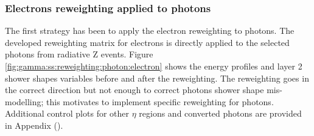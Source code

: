 \subsubsection{Electrons reweighting applied to photons}
The first strategy has been to apply the electron reweighting to photons. The developed reweighting matrix for electrons is directly applied to the selected photons from radiative Z events. Figure \ref{fig:gamma:ss:reweighting:photon:electron} shows the energy profiles and layer 2 shower shapes variables before and after the reweighting. The reweighting goes in the correct direction but not enough to correct photons shower shape mis-modelling; this motivates to implement specific reweighting for photons. Additional control plots for other $\eta$ regions and converted photons are provided in Appendix ().
\begin{figure}[ht]
    \centering
	 \\

\end{figure}
